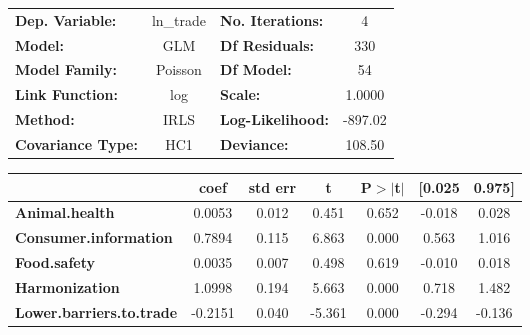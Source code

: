 \begin{center}
\begin{tabular}{lclc}
\toprule
\textbf{Dep. Variable:}                                            &   ln\_trade   & \textbf{  No. Iterations:    } &     4       \\
\textbf{Model:}                                                    &      GLM      & \textbf{  Df Residuals:      } &    330      \\
\textbf{Model Family:}                                             &    Poisson    & \textbf{  Df Model:          } &     54      \\
\textbf{Link Function:}                                            &      log      & \textbf{  Scale:             } &    1.0000   \\
\textbf{Method:}                                                   &      IRLS     & \textbf{  Log-Likelihood:    } &   -897.02   \\
\textbf{Covariance Type:}                                          &      HC1      & \textbf{  Deviance:          } &    108.50   \\
\bottomrule
\end{tabular}
\begin{tabular}{lcccccc}
                                                                   & \textbf{coef} & \textbf{std err} & \textbf{t} & \textbf{P$> |$t$|$} & \textbf{[0.025} & \textbf{0.975]}  \\
\midrule
\textbf{Animal.health}                                             &       0.0053  &        0.012     &     0.451  &         0.652        &       -0.018    &        0.028     \\
\textbf{Consumer.information}                                      &       0.7894  &        0.115     &     6.863  &         0.000        &        0.563    &        1.016     \\
\textbf{Food.safety}                                               &       0.0035  &        0.007     &     0.498  &         0.619        &       -0.010    &        0.018     \\
\textbf{Harmonization}                                             &       1.0998  &        0.194     &     5.663  &         0.000        &        0.718    &        1.482     \\
\textbf{Lower.barriers.to.trade}                                   &      -0.2151  &        0.040     &    -5.361  &         0.000        &       -0.294    &       -0.136     \\

\end{tabular}
\end{center}
